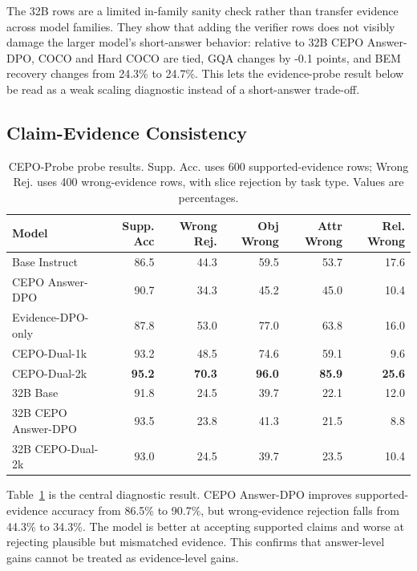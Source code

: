 \documentclass[10pt,twocolumn,letterpaper]{article}
\newcommand{\benchmark}{CEPO-Probe}
\newcommand{\answerdpo}{CEPO Answer-DPO}
\newcommand{\evidencedpo}{Evidence-DPO-only}
\newcommand{\dualonek}{CEPO-Dual-1k}
\newcommand{\dualtwok}{CEPO-Dual-2k}
\begin{document}
The 32B rows are a limited in-family sanity check rather than transfer
evidence across model families. They show that adding the verifier rows does
not visibly damage the larger model's short-answer behavior: relative to 32B
\answerdpo{}, COCO and Hard COCO are tied, GQA changes by -0.1 points, and BEM
recovery changes from 24.3\% to 24.7\%. This lets the evidence-probe result
below be read as a weak scaling diagnostic instead of a short-answer trade-off.

\subsection{Claim-Evidence Consistency}

\begin{table}[t]
\centering
\scriptsize
\setlength{\tabcolsep}{4pt}
\begin{tabular}{@{}lrrrrr@{}}
\toprule
Model & Supp. Acc & Wrong Rej. & Obj Wrong & Attr Wrong & Rel. Wrong \\
\midrule
Base Instruct & 86.5 & 44.3 & 59.5 & 53.7 & 17.6 \\
\answerdpo{} & 90.7 & 34.3 & 45.2 & 45.0 & 10.4 \\
\evidencedpo{} & 87.8 & 53.0 & 77.0 & 63.8 & 16.0 \\
\dualonek{} & 93.2 & 48.5 & 74.6 & 59.1 & 9.6 \\
\dualtwok{} & \textbf{95.2} & \textbf{70.3} & \textbf{96.0} & \textbf{85.9} & \textbf{25.6} \\
\midrule
32B Base & 91.8 & 24.5 & 39.7 & 22.1 & 12.0 \\
32B \answerdpo{} & 93.5 & 23.8 & 41.3 & 21.5 & 8.8 \\
32B \dualtwok{} & 93.0 & 24.5 & 39.7 & 23.5 & 10.4 \\
\bottomrule
\end{tabular}
\caption{\benchmark{} probe results. Supp. Acc. uses 600 supported-evidence
rows; Wrong Rej. uses 400 wrong-evidence rows, with slice rejection by task
type. Values are percentages.}
\label{tab:probe}
\end{table}

Table~\ref{tab:probe} is the central diagnostic result. \answerdpo{} improves
supported-evidence accuracy from 86.5\% to 90.7\%, but wrong-evidence rejection
falls from 44.3\% to 34.3\%. The model is better at accepting supported claims
and worse at rejecting plausible but mismatched evidence. This confirms that
answer-level gains cannot be treated as evidence-level gains.
\end{document}
